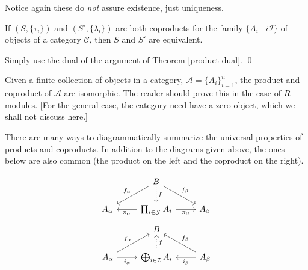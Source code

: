 Notice again these do \emph{not} assure existence, just uniqueness. 


\begin{thm}
If $(S,\{\tau_i\})$ and $(S',\{\lambda_i\})$ are both coproducts for the family $\{A_i\;|\; i \mathcal{I}\}$ of objects of a category $\mathcal{C}$, then $S$ and $S'$ are equivalent. 
\end{thm}

\pf Simply use the dual of the argument of Theorem \ref{product-dual}. \qed \\


\begin{rem}
Given a finite collection of objects in a category, $\mathcal{A}=\{A_i\}_{i=1}^n$, the product and coproduct of $\mathcal{A}$ are isomorphic. The reader should prove this in the case of $R$-modules. [For the general case, the category need have a zero object, which we shall not discuss here.] 
\end{rem}


\begin{rem}
There are many ways to diagrammatically summarize the universal properties of products and coproducts. In addition to the diagrams given above, the ones below are also common (the product on the left and the coproduct on the right). 
\begin{multicols}{2}
	\[
	\begin{tikzcd}
		& B \arrow[swap]{dl}{f_\alpha} \arrow[dotted]{d}{f} \arrow{dr}{f_\beta} & \\
	A_\alpha & \prod_{i \in \mathcal{J}} A_i \arrow{l}{\pi_\alpha} \arrow[swap]{r}{\pi_\beta} & A_\beta
	\end{tikzcd}
	\]
\break 
	\[
	\begin{tikzcd}
		& B & \\
	A_\alpha \arrow{ur}{f_\alpha} \arrow[swap]{r}{i_\alpha} & \bigoplus_{i \in \mathcal{I}} A_i \arrow[swap,dotted]{u}{f} & A_\beta \arrow{l}{i_\beta} \arrow[swap]{ul}{f_\beta} 
	\end{tikzcd}
	\]
\end{multicols}
\end{rem}